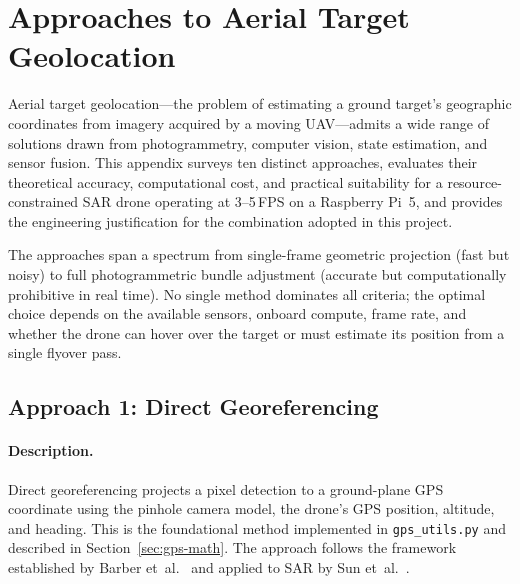 
\section{Approaches to Aerial Target Geolocation}\label{sec:loc-approaches}

Aerial target geolocation---the problem of estimating a ground target's geographic coordinates from imagery acquired by a moving UAV---admits a wide range of solutions drawn from photogrammetry, computer vision, state estimation, and sensor fusion.  This appendix surveys ten distinct approaches, evaluates their theoretical accuracy, computational cost, and practical suitability for a resource-constrained SAR drone operating at 3--5\,FPS on a Raspberry Pi~5, and provides the engineering justification for the combination adopted in this project.

The approaches span a spectrum from single-frame geometric projection (fast but noisy) to full photogrammetric bundle adjustment (accurate but computationally prohibitive in real time).  No single method dominates all criteria; the optimal choice depends on the available sensors, onboard compute, frame rate, and whether the drone can hover over the target or must estimate its position from a single flyover pass.

\FloatBarrier
\subsection{Approach 1: Direct Georeferencing}\label{sec:approach-direct}

\paragraph{Description.}
Direct georeferencing projects a pixel detection to a ground-plane GPS coordinate using the pinhole camera model, the drone's GPS position, altitude, and heading.  This is the foundational method implemented in \texttt{gps\_utils.py} and described in Section~\ref{sec:gps-math}.  The approach follows the framework established by Barber et~al.~\cite{barber2006vision} and applied to SAR by Sun et~al.~\cite{sun2016sar}.


